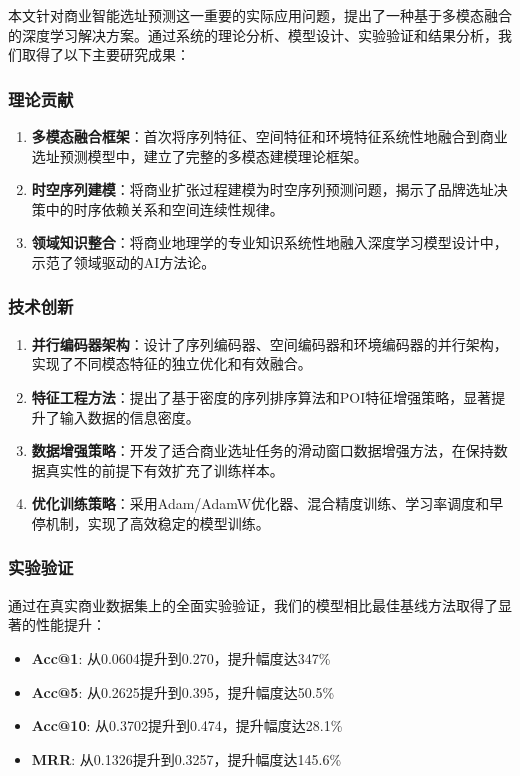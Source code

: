 \documentclass{article}
\begin{document}
本文针对商业智能选址预测这一重要的实际应用问题，提出了一种基于多模态融合的深度学习解决方案。通过系统的理论分析、模型设计、实验验证和结果分析，我们取得了以下主要研究成果：

\subsubsection{理论贡献}

\begin{enumerate}
\item \textbf{多模态融合框架}：首次将序列特征、空间特征和环境特征系统性地融合到商业选址预测模型中，建立了完整的多模态建模理论框架。
\item \textbf{时空序列建模}：将商业扩张过程建模为时空序列预测问题，揭示了品牌选址决策中的时序依赖关系和空间连续性规律。
\item \textbf{领域知识整合}：将商业地理学的专业知识系统性地融入深度学习模型设计中，示范了领域驱动的AI方法论。
\end{enumerate}

\subsubsection{技术创新}

\begin{enumerate}
\item \textbf{并行编码器架构}：设计了序列编码器、空间编码器和环境编码器的并行架构，实现了不同模态特征的独立优化和有效融合。
\item \textbf{特征工程方法}：提出了基于密度的序列排序算法和POI特征增强策略，显著提升了输入数据的信息密度。
\item \textbf{数据增强策略}：开发了适合商业选址任务的滑动窗口数据增强方法，在保持数据真实性的前提下有效扩充了训练样本。
\item \textbf{优化训练策略}：采用Adam/AdamW优化器、混合精度训练、学习率调度和早停机制，实现了高效稳定的模型训练。
\end{enumerate}

\subsubsection{实验验证}

通过在真实商业数据集上的全面实验验证，我们的模型相比最佳基线方法取得了显著的性能提升：

\begin{itemize}
\item \textbf{Acc@1}: 从0.0604提升到0.270，提升幅度达347\%
\item \textbf{Acc@5}: 从0.2625提升到0.395，提升幅度达50.5\%
\item \textbf{Acc@10}: 从0.3702提升到0.474，提升幅度达28.1\%
\item \textbf{MRR}: 从0.1326提升到0.3257，提升幅度达145.6\%
\end{itemize}
\end{document}
